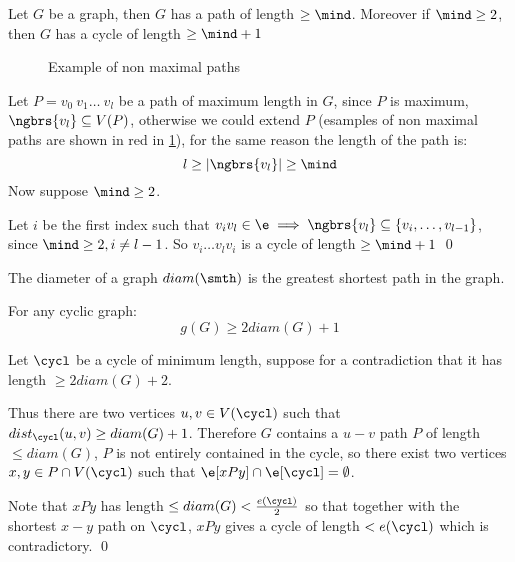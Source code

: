 \begin{customproposition}{1.6}
    \label{proposition:1.6}
    Let $G$ be a graph, then $G$ has a path of length $\geq \mind$. Moreover if $\mind \geq 2$, then $G$ has a cycle of length $\geq \mind + 1$
\end{customproposition}
\begin{prf}
    \begin{figure}[h]
        \centering
        
        \caption{Example of non maximal paths}
        \label{fig:proposition1.6}
    \end{figure}
    Let $P = v_0\:v_1\dots\:v_l$ be a path of maximum length in $G$, since $P$ is maximum, $\ngbrs{v_l} \subseteq V(P)$, otherwise we could extend $P$ (esamples of non maximal paths are shown in red in \ref{fig:proposition1.6}), for the same reason the length of the path is:
    \begin{equation*}
        l \geq |\ngbrs{v_l}| \geq \mind
    \end{equation*}
    Now suppose $\mind \geq 2$.

    Let $i$ be the first index such that $v_iv_l \in \e \implies \ngbrs{v_l} \subseteq \{v_i, \dots, v_{l - 1}\}$, since $\mind \geq 2, i \neq l - 1$. So $v_i \dots v_lv_i$ is a cycle of length $\geq \mind + 1$ \qed
\end{prf}
\begin{definition}[Diameter]
    The diameter of a graph $diam(\smth)$ is the greatest shortest path in the graph.
\end{definition}
\begin{customproposition}{1.7}
    \label{proposition:1.7}
    For any cyclic graph:
    \begin{equation*}
        g(G) \geq 2diam(G) + 1
    \end{equation*}
\end{customproposition}
\begin{prf}
    Let $\cycl$ be a cycle of minimum length, suppose for a contradiction that it has length $\geq 2diam(G) + 2$.

    Thus there are two vertices $u, v \in V(\cycl)$ such that $dist_{\cycl}(u, v) \geq diam(G) + 1$. Therefore $G$ contains a $u - v$ path $P$ of length $\leq diam(G)$, $P$ is not entirely contained in the cycle, so there exist two vertices $x, y \in P \cap V(\cycl)$ such that $\e[xPy] \cap \e[\cycl] = \emptyset$.

    Note that $xPy$ has length $\leq diam(G) < \frac{e(\cycl)}{2}$ so that together with the shortest $x - y$ path on $\cycl$, $xPy$ gives a cycle of length $< e(\cycl)$ which is contradictory. \qed
\end{prf}
